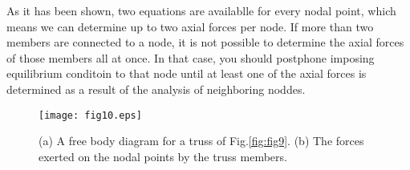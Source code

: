 \documentclass[10pt,a4j]{article}
\begin{document}
As it has been shown, two equations are availablle for every nodal point, which 
means we can determine up to two axial forces per node. 
If more than two members are connected to a node, it is not possible to 
determine the axial forces of those members all at once. 
In that case, you should postphone imposing equilibrium conditoin to that 
node until at least one of the axial forces is determined 
as a result of the analysis of neighboring noddes. 
\begin{figure}[h]
	\begin{center}
	\texttt{[image: fig10.eps]} 
	\end{center}
	\caption{(a) A free body diagram for a truss of Fig.\ref{fig:fig9}. 
	(b) The forces exerted on the nodal points by the truss members.} 
	\label{fig:fig10}
\end{figure}
\end{document}
